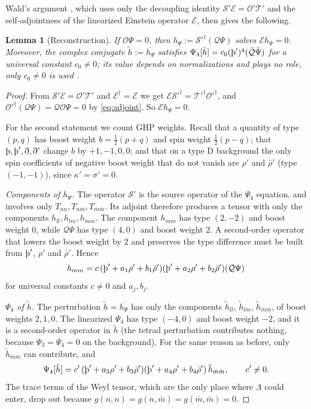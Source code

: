 \documentclass[11pt]{amsart}
\newtheorem{lemma}[theorem]{Lemma}
\theoremstyle{definition}
\theoremstyle{remark}
\numberwithin{equation}{section}
\newcommand{\Th}{\text{\th}}
\begin{document}
Wald's argument \cite{Wal78}, which uses only the decoupling identity $\mathcal S'\mathcal E=\mathcal O'\mathcal T'$
and the self-adjointness of the linearized Einstein operator $\mathcal E$, then gives the following.

\begin{lemma}[Reconstruction]\label{lem:recon}
If $\mathcal O\Psi=0$, then $h_\Psi:=\mathcal S'^\dagger(\mathcal Q\Psi)$ solves $\mathcal E h_\Psi=0$. Moreover, the complex
conjugate $\tilde h:=\overline{h_\Psi}$ satisfies $\Psi_4[\tilde h]=c_0(\Th')^4(\bar{\mathcal Q}\bar\Psi)$ for a universal constant
$c_0\neq0$; its value depends on normalizations and plays no role, only $c_0\ne0$ is used \cite{Wal78,LW02}.
\end{lemma}

\begin{proof}
From $\mathcal S'\mathcal E=\mathcal O'\mathcal T'$ and $\mathcal E^\dagger=\mathcal E$ we get
$\mathcal E\mathcal S'^\dagger=\mathcal T'^\dagger\mathcal O'^\dagger$, and $\mathcal O'^\dagger(\mathcal Q\Psi)=\mathcal Q\mathcal O\Psi=0$
by \eqref{eq:adjoint}. So $\mathcal E h_\Psi=0$.

For the second statement we count GHP weights. Recall that a quantity of type $(p,q)$ has boost weight
$b=\frac12(p+q)$ and spin weight $\frac12(p-q)$; that $\Th,\Th',\eth,\eth'$ change $b$ by $+1,-1,0,0$; and that on a type D
background the only spin coefficients of negative boost weight that do not vanish are $\rho'$ and $\bar\rho'$
(type $(-1,-1)$), since $\kappa'=\sigma'=0$.

\emph{Components of $h_\Psi$.} The operator $\mathcal S'$ is the source operator of the $\Psi_4$ equation, and involves only
$T_{nn},T_{n\bar m},T_{\bar m\bar m}$. Its adjoint therefore produces a tensor with only the components
$h_{ll},h_{lm},h_{mm}$. The component $h_{mm}$ has type $(2,-2)$ and boost weight $0$, while $\mathcal Q\Psi$ has type
$(4,0)$ and boost weight $2$. A second-order operator that lowers the boost weight by $2$ and preserves the type
difference must be built from $\Th'$, $\rho'$ and $\bar\rho'$. Hence
\[
h_{mm}=c\,(\Th'+a_1\rho'+b_1\bar\rho')(\Th'+a_2\rho'+b_2\bar\rho')(\mathcal Q\Psi)
\]
for universal constants $c\ne0$ and $a_j,b_j$.

\emph{$\Psi_4$ of $\tilde h$.} The perturbation $\tilde h=\overline{h_\Psi}$ has only the components $\tilde h_{ll}$,
$\tilde h_{l\bar m}$, $\tilde h_{\bar m\bar m}$, of boost weights $2,1,0$. The linearized $\Psi_4$ has type $(-4,0)$ and boost
weight $-2$, and it is a second-order operator in $\tilde h$ (the tetrad perturbation contributes nothing, because
$\Psi_3=\Psi_4=0$ on the background). For the same reason as before, only $\tilde h_{\bar m\bar m}$ can contribute, and
\[
\Psi_4[\tilde h]=c'\,(\Th'+a_3\rho'+b_3\bar\rho')(\Th'+a_4\rho'+b_4\bar\rho')\,\tilde h_{\bar m\bar m},\qquad c'\ne0 .
\]
The trace terms of the Weyl tensor, which are the only place where $\Lambda$ could enter, drop out because
$g(n,n)=g(n,\bar m)=g(\bar m,\bar m)=0$.


\end{proof}
\end{document}
